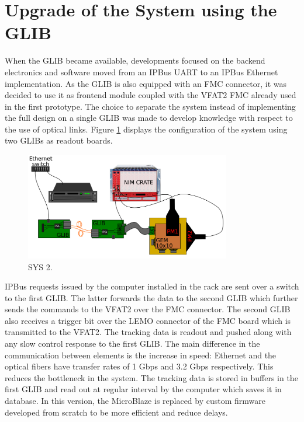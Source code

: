   \section{Upgrade of the System using the GLIB}

    When the GLIB became available, developments focused on the backend electronics and software moved from an IPBus UART to an IPBus Ethernet implementation. As the GLIB is also equipped with an FMC connector, it was decided to use it as frontend module coupled with the VFAT2 FMC already used in the first prototype. The choice to separate the system instead of implementing the full design on a single GLIB was made to develop knowledge with respect to the use of optical links. Figure \ref{fig:III-1-sys-2} displays the configuration of the system using two GLIBs as readout boards. \\

    \begin{figure}[h!]
      \centering
      \includegraphics[width=0.8\textwidth]{img/III-1-arch/sys_2.png}
      \caption{SYS 2.}
      \label{fig:III-1-sys-2}
    \end{figure}

    IPBus requests issued by the computer installed in the rack are sent over a switch to the first GLIB. The latter forwards the data to the second GLIB which further sends the commands to the VFAT2 over the FMC connector. The second GLIB also receives a trigger bit over the LEMO connector of the FMC board which is transmitted to the VFAT2. The tracking data is readout and pushed along with any slow control response to the first GLIB. The main difference in the communication between elements is the increase in speed: Ethernet and the optical fibers have transfer rates of 1 Gbps and 3.2 Gbps respectively. This reduces the bottleneck in the system. The tracking data is stored in buffers in the first GLIB and read out at regular interval by the computer which saves it in database. In this version, the MicroBlaze is replaced by custom firmware developed from scratch to be more efficient and reduce delays.

